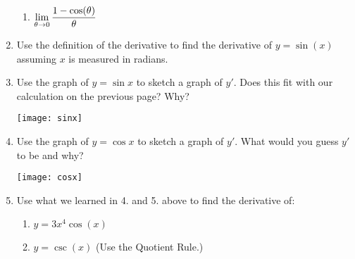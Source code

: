 \documentclass[11pt,fleqn]{article}
\begin{document}
\begin{enumerate}
\begin{enumerate}
	\item $\displaystyle{\lim_{\theta \to 0} \frac{1-\cos (\theta)}{\theta}}$
	\end{enumerate}
	
\item Use the definition of the derivative to find the derivative of $y=\sin(x)$ assuming $x$ is measured in radians.\\
\newpage
\item Use the graph of $y = \sin x$ to sketch a graph of
$y'$. Does this fit with our calculation on the previous page? Why?

\begin{flushleft}
  \texttt{[image: sinx]}
\end{flushleft}
\vskip0.25in

\item Use the graph of $y = \cos x$ to sketch a graph of
$y'$. What would you guess $y'$ to be and why?

\begin{flushleft}
  \texttt{[image: cosx]}
\end{flushleft}
\vskip0.25in
\item Use what we learned in 4. and 5. above to find the derivative of:
	\begin{enumerate}
	\item $y=3x^4 \cos(x)$
	\vfill
	\item $y=\csc(x)$ (Use the Quotient Rule.)
	\vfill
	\end{enumerate}
\end{enumerate}
\end{document}
